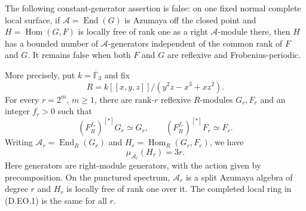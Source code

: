 \begin{example}
\label{D:elliptic-cone-order-generators}
The following constant-generator assertion is false: on one fixed
normal complete local surface, if $\mathcal A=\operatorname{End}(G)$
is Azumaya off the closed point and $H=\operatorname{Hom}(G,F)$ is
locally free of rank one as a right $\mathcal A$-module there, then
$H$ has a bounded number of $\mathcal A$-generators independent of
the common rank of $F$ and $G$. It remains false when both $F$ and
$G$ are reflexive and Frobenius-periodic.

More precisely, put $k=\overline{\mathbb F}_3$ and fix
\[
 R=k[[x,y,z]]/(y^2z-x^3+xz^2).
 \tag{D.EO.1}
\]
For every $r=2^m$, $m\ge1$, there are rank-$r$ reflexive
$R$-modules $G_r,F_r$ and an integer $f_r>0$ such that
\[
 (F_R^{f_r})^{[*]}G_r\simeq G_r,
 \qquad (F_R^{f_r})^{[*]}F_r\simeq F_r.
 \tag{D.EO.2}
\]
Writing $\mathcal A_r=\operatorname{End}_R(G_r)$ and
$H_r=\operatorname{Hom}_R(G_r,F_r)$, we have
\[
 \mu_{\mathcal A_r}(H_r)=3r.
 \tag{D.EO.3}
\]
Here generators are right-module generators, with the action given
by precomposition. On the punctured spectrum, $\mathcal A_r$ is
a split Azumaya algebra of degree $r$ and $H_r$ is locally free
of rank one over it. The completed local ring in (D.EO.1) is the
same for all $r$.
\end{example}
